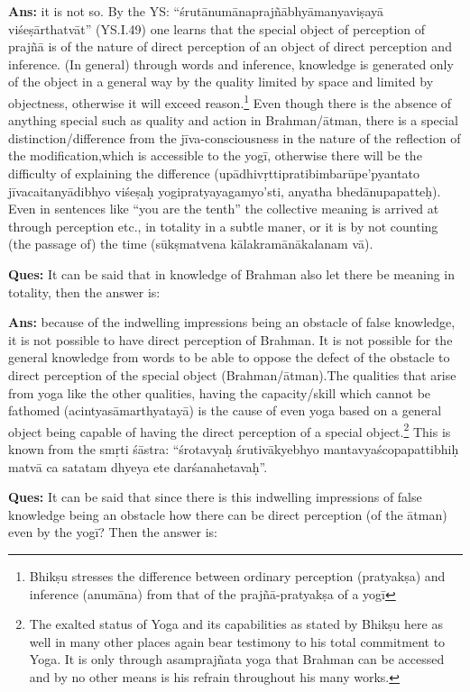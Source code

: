 \textbf{Ans:}  it is not so.  By the YS: “śrutānumānaprajñābhyāmanyaviṣayā viśeṣārthatvāt” (YS.I.49) one learns that the special object of perception of prajñā is of the nature of direct perception of an object of direct perception and inference. (In general) through words and inference, knowledge is generated only of the object in a general way by the quality limited by space and limited by objectness, otherwise it will exceed reason.\footnote{Bhikṣu stresses the difference between ordinary perception (pratyakṣa) and inference (anumāna) from that of the prajñā-pratyakṣa of a yogī} Even though there is the absence of anything special such as quality and action in Brahman/ātman, there is a  special distinction/difference from the jīva-consciousness in the nature of the reflection of the modification,which is accessible to the yogī, otherwise there will be the difficulty of explaining the difference (upādhivṛttipratibimbarūpe’pyantato jīvacaitanyādibhyo viśeṣaḥ yogipratyayagamyo’sti, anyatha bhedānupapatteḥ). Even in sentences like “you are the tenth” the collective meaning is arrived at through perception etc., in totality in a subtle maner, or it is by not counting (the passage of) the time (sūkṣmatvena kālakramānākalanam vā).

\textbf{Ques:} It can be said that in knowledge of Brahman also let there be meaning in totality, then the answer is: 

\textbf{Ans:} because of the indwelling impressions being an obstacle of false knowledge, it is not possible to have direct perception of Brahman. It is not possible for the general knowledge from words to be able to oppose the defect of the obstacle to direct perception of the special object (Brahman/ātman).The qualities that arise from yoga like the other qualities, having the capacity/skill which cannot be fathomed (acintyasāmarthyatayā) is the cause of even yoga based on a general object being capable of  having the direct perception of a special object.\footnote{The exalted status of Yoga and its capabilities as stated by Bhikṣu here as well in many other places again bear testimony to his total commitment to Yoga. It is only through asamprajñata yoga that Brahman can be accessed and by no other means is his refrain throughout his many works.} This is known from the smṛti śāstra: “śrotavyaḥ śrutivākyebhyo mantavyaścopapattibhiḥ matvā ca satatam dhyeya ete darśanahetavaḥ”.

\textbf{Ques:} It can be said that since there is this indwelling impressions of false knowledge being an obstacle how there can be direct perception (of the ātman) even by the yogī? Then the answer is:

